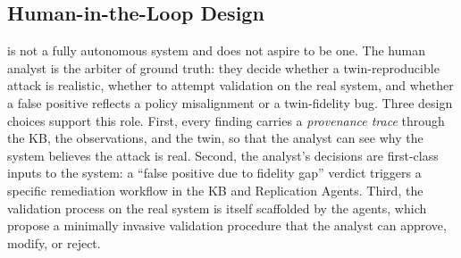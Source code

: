 \subsection{Human-in-the-Loop Design}
\label{sec:approach-human}

\sysname is not a fully autonomous system and does not aspire to be
one. The human analyst is the arbiter of ground truth: they decide
whether a twin-reproducible attack is realistic, whether to attempt
validation on the real system, and whether a false positive reflects a
policy misalignment or a twin-fidelity bug. Three design choices
support this role. First, every finding carries a \emph{provenance
trace} through the KB, the observations, and the twin, so that the
analyst can see why the system believes the attack is real. Second,
the analyst's decisions are first-class inputs to the system: a
``false positive due to fidelity gap'' verdict triggers a specific
remediation workflow in the KB and Replication Agents. Third, the
validation process on the real system is itself scaffolded by the
agents, which propose a minimally invasive validation procedure that
the analyst can approve, modify, or reject.
